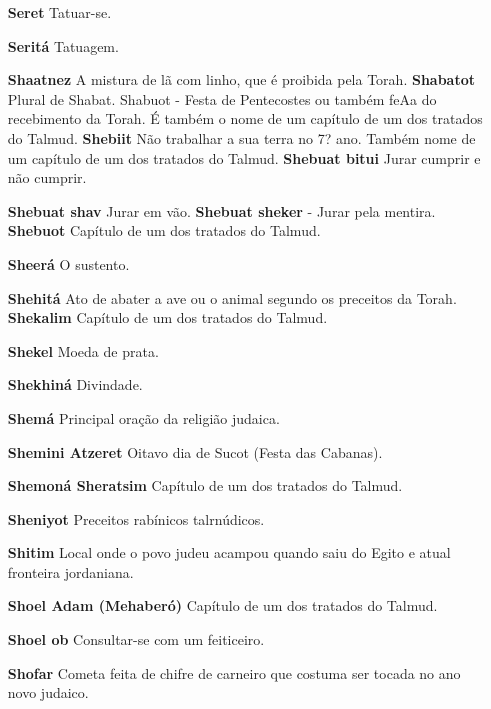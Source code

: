 \begin{itemize}
\begin{enumrate}
\begin{itemize}
\begin{itemize}
\begin{itemize}
\begin{itemize}
\begin{itemize}
\item[\textbf{Seret}] Tatuar-se.

\item[\textbf{Seritá}] Tatuagem.

\item[\textbf{Shaatnez}] A mistura de lã com linho, que é proibida pela
Torah. \textbf{Shabatot} Plural de Shabat. Shabuot - Festa de
Pentecostes ou também feAa do recebimento da To­rah. É também o nome de
um capítu­lo de um dos tratados do Talmud. \textbf{Shebiit} Não
trabalhar a sua terra no 7? ano. Também nome de um capítu­lo de um dos
tratados do Talmud. \textbf{Shebuat bitui} Jurar cumprir e não
cumprir.

\item[\textbf{Shebuat shav} Jurar em vão. \textbf{Shebuat sheker}] - Jurar
pela mentira. \textbf{Shebuot} Capítulo de um dos trata­dos do Talmud.

\item[\textbf{Sheerá}] O sustento.

\item[\textbf{Shehitá}] Ato de abater a ave ou o ani­mal segundo os preceitos
da Torah. \textbf{Shekalim} Capítulo de um dos trata­dos do Talmud.

\item[\textbf{Shekel}] Moeda de prata.

\item[\textbf{Shekhiná}] Divindade.

\item[\textbf{Shemá}] Principal oração da religião judaica.

\item[\textbf{Shemini Atzeret}] Oitavo dia de Su­cot (Festa das Cabanas).

\item[\textbf{Shemoná Sheratsim}] Capítulo de um dos tratados do Talmud.
\item[\textbf{Sheniyot}] Preceitos rabínicos talrnú­dicos.

\item[\textbf{Shitim}] Local onde o povo judeu acampou quando saiu do Egito e
atual fronteira jordaniana.

\item[\textbf{Shoel Adam (Mehaberó)}] Capítulo de um dos tratados do Talmud.
\item[\textbf{Shoel ob}] Consultar-se com um feiti­ceiro.

\item[\textbf{Shofar}] Cometa feita de chifre de car­neiro que costuma ser
tocada no ano novo judaico.


\end{itemize}
\end{itemize}
\end{itemize}
\end{itemize}
\end{itemize}
\end{enumrate}
\end{itemize}
